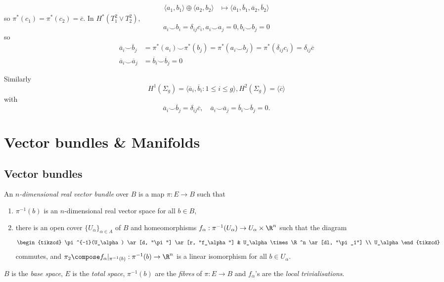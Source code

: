 \documentclass[a4paper]{article}
\newcommand*{\cp}{\smile} %
\begin{document}
\begin{eg}
\begin{enumerate}
\begin{align*}
      \langle a_1, b_1 \rangle \oplus \langle a_2, b_2 \rangle &\mapsto \langle \overline a_1, \overline b_1, \overline a_2, \overline b_2 \rangle
    \end{align*}
    so \(\pi^*(c_1) = \pi^*(c_2) = \overline c\). In \(H^*(T_1^2 \vee T_2^2)\),
    \[
      a_i \cp b_i = \delta_{ij} c_i, a_i \cp a_j = 0, b_i \cp b_j = 0
    \]
    so
    \begin{align*}
      \overline a_i \cp \overline b_j &= \pi^*(a_i) \cp \pi^*(b_j) = \pi^*(a_i \cp b_j) = \pi^*(\delta_{ij} c_i) = \delta_{ij} \overline c \\
      \overline a_i \cp \overline a_j &= \overline b_i \cp \overline b_j = 0
    \end{align*}

    Similarly
    \[
      H^1(\Sigma_g) = \langle \overline a_i, \overline b_i: 1 \leq i \leq g\rangle, H^2(\Sigma_g) = \langle \overline c \rangle
    \]
    with
    \[
      \overline a_i \cp \overline b_j = \delta_{ij} \overline c, \quad
      \overline a_i \cp \overline a_j = \overline b_i \cp \overline b_j = 0.
    \]
  \end{enumerate}
\end{eg}

\section{Vector bundles \& Manifolds}

\subsection{Vector bundles}

\begin{definition}
  An \emph{\(n\)-dimensional real vector bundle} over \(B\) is a map \(\pi: E \to B\) such that
  \begin{enumerate}
  \item \(\pi^{-1}(b)\) is an \(n\)-dimensional real vector space for all \(b \in B\),
  \item there is an open cover \(\{U_\alpha\}_{\alpha \in A}\) of \(B\) and homeomorphisms \(f_\alpha: \pi^{-1}(U_\alpha) \to U_\alpha \times \R^n\) such that the diagram
    \[
      \begin{tikzcd}
        \pi^{-1}(U_\alpha) \ar[d, "\pi"] \ar[r, "f_\alpha"] & U_\alpha \times \R^n \ar[dl, "\pi_1"] \\
        U_\alpha
      \end{tikzcd}
    \]
    commutes, and \(\pi_2 \compose f_\alpha|_{\pi^{-1}(b)}: \pi^{-1}(b) \to \R^n\) is a linear isomorphism for all \(b \in U_\alpha\).
  \end{enumerate}

  \(B\) is the \emph{base space}, \(E\) is the \emph{total space}, \(\pi^{-1}(b)\) are the \emph{fibres} of \(\pi: E \to B\) and \(f_\alpha\)'s are the \emph{local trivialisations}.
\end{definition}
\end{document}
